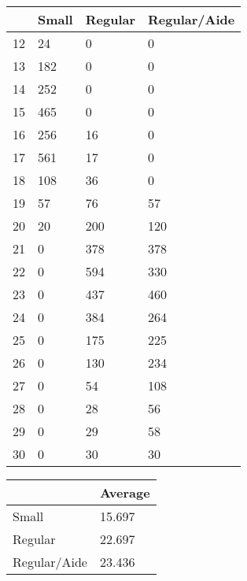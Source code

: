 \documentclass[a4paper,11pt]{article}
\begin{document}
\begin{table}[htbp]
	\begin{tabular}{llll} \hline \hline
		& Small  & Regular  & Regular/Aide  \\  \hline 
		12 & 24 & 0 & 0 \\  
		13 & 182 & 0 & 0 \\  
		14 & 252 & 0 & 0 \\  
		15 & 465 & 0 & 0 \\  
		16 & 256 & 16 & 0 \\  
		17 & 561 & 17 & 0 \\  
		18 & 108 & 36 & 0 \\  
		19 & 57 & 76 & 57 \\  
		20 & 20 & 200 & 120 \\  
		21 & 0 & 378 & 378 \\  
		22 & 0 & 594 & 330 \\  
		23 & 0 & 437 & 460 \\  
		24 & 0 & 384 & 264 \\  
		25 & 0 & 175 & 225 \\  
		26 & 0 & 130 & 234 \\  
		27 & 0 & 54 & 108 \\  
		28 & 0 & 28 & 56 \\  
		29 & 0 & 29 & 58 \\  
		30 & 0 & 30 & 30 \\  
		\hline \hline \end{tabular}
\end{table}


\begin{table}[htbp]
	\begin{tabular}{ll} \hline \hline
		& Average  \\  \hline 
		Small & 15.697 \\  
		Regular & 22.697 \\  
		Regular/Aide & 23.436 \\  
		\hline \hline \end{tabular}
\end{table}
\end{document}
